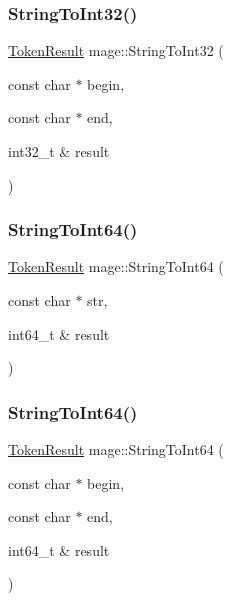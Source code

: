 \hypertarget{namespacemage_a011b7977a7ae88795aac61e0e921bffe}{}\label{namespacemage_a011b7977a7ae88795aac61e0e921bffe} 
\subsubsection{\texorpdfstring{String\+To\+Int32()}{StringToInt32()}\hspace{0.1cm}{\footnotesize\ttfamily [2/2]}}
{\footnotesize\ttfamily \hyperlink{namespacemage_a2178ba2411db5912f41b2e7698c2037d}{Token\+Result} mage\+::\+String\+To\+Int32 (\begin{DoxyParamCaption}\item[{const char $\ast$}]{begin,  }\item[{const char $\ast$}]{end,  }\item[{int32\+\_\+t \&}]{result }\end{DoxyParamCaption})}

\hypertarget{namespacemage_a9134bbf3717893628e324fcf83e203a0}{}\label{namespacemage_a9134bbf3717893628e324fcf83e203a0} 
\subsubsection{\texorpdfstring{String\+To\+Int64()}{StringToInt64()}\hspace{0.1cm}{\footnotesize\ttfamily [1/2]}}
{\footnotesize\ttfamily \hyperlink{namespacemage_a2178ba2411db5912f41b2e7698c2037d}{Token\+Result} mage\+::\+String\+To\+Int64 (\begin{DoxyParamCaption}\item[{const char $\ast$}]{str,  }\item[{int64\+\_\+t \&}]{result }\end{DoxyParamCaption})}

\hypertarget{namespacemage_a1e044f5c734c6597945b775100c45086}{}\label{namespacemage_a1e044f5c734c6597945b775100c45086} 
\subsubsection{\texorpdfstring{String\+To\+Int64()}{StringToInt64()}\hspace{0.1cm}{\footnotesize\ttfamily [2/2]}}
{\footnotesize\ttfamily \hyperlink{namespacemage_a2178ba2411db5912f41b2e7698c2037d}{Token\+Result} mage\+::\+String\+To\+Int64 (\begin{DoxyParamCaption}\item[{const char $\ast$}]{begin,  }\item[{const char $\ast$}]{end,  }\item[{int64\+\_\+t \&}]{result }\end{DoxyParamCaption})}


